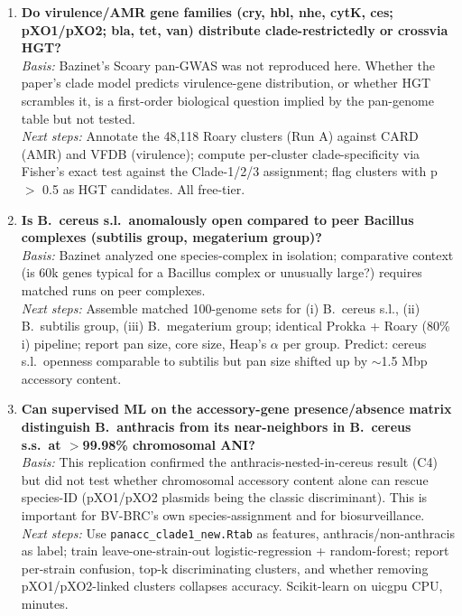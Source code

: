 \begin{enumerate}
    \item \textbf{Do virulence/AMR gene families (cry, hbl, nhe, cytK, ces; pXO1/pXO2; bla, tet, van) distribute clade-restrictedly or crossvia HGT?}\\
    \emph{Basis:} Bazinet's Scoary pan-GWAS was not reproduced here. Whether the paper's clade model predicts virulence-gene distribution, or whether HGT scrambles it, is a first-order biological question implied by the pan-genome table but not tested.\\
    \emph{Next steps:} Annotate the 48{,}118 Roary clusters (Run A) against CARD (AMR) and VFDB (virulence); compute per-cluster clade-specificity via Fisher's exact test against the Clade-1/2/3 assignment; flag clusters with p $>$ 0.5 as HGT candidates. All free-tier.

    \item \textbf{Is B.\ cereus s.l.\ anomalously open compared to peer Bacillus complexes (subtilis group, megaterium group)?}\\
    \emph{Basis:} Bazinet analyzed one species-complex in isolation; comparative context (is 60k genes typical for a Bacillus complex or unusually large?) requires matched runs on peer complexes.\\
    \emph{Next steps:} Assemble matched 100-genome sets for (i) B.\ cereus s.l., (ii) B.\ subtilis group, (iii) B.\ megaterium group; identical Prokka + Roary (80\% i) pipeline; report pan size, core size, Heap's $\alpha$ per group. Predict: cereus s.l.\ openness comparable to subtilis but pan size shifted up by $\sim$1.5 Mbp accessory content.

    \item \textbf{Can supervised ML on the accessory-gene presence/absence matrix distinguish B.\ anthracis from its near-neighbors in B.\ cereus s.s.\ at $>$99.98\% chromosomal ANI?}\\
    \emph{Basis:} This replication confirmed the anthracis-nested-in-cereus result (C4) but did not test whether chromosomal accessory content alone can rescue species-ID (pXO1/pXO2 plasmids being the classic discriminant). This is important for BV-BRC's own species-assignment and for biosurveillance.\\
    \emph{Next steps:} Use \texttt{panacc\_clade1\_new.Rtab} as features, anthracis/non-anthracis as label; train leave-one-strain-out logistic-regression + random-forest; report per-strain confusion, top-k discriminating clusters, and whether removing pXO1/pXO2-linked clusters collapses accuracy. Scikit-learn on uicgpu CPU, minutes.
\end{enumerate}
